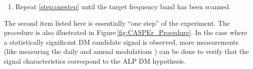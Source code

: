 \documentclass{WileyMSP-template}
\newcommand{\YZ}[1]{\textcolor{purple}{Yuzhe: #1}}
\newcommand{\HB}[1]{\textcolor{orange}{Hendrik: #1}}
\newcommand{\DK}[1]{\textcolor{brown}{Derek: #1}}
\begin{document}
\begin{enumerate}[label = (\arabic*)]
\begin{itemize}[label={}]
			\item G. If a DM candidate is found, further analysis on the candidate is performed and the measurement at this frequency is repeated. 
			\item H. If no DM candidates is found, certain ALP couplings strength can be excluded for the given mass. 
		\end{itemize}
		Note that after taking data, the value of the field can be incremented for the next step of the scan;
		\label{step:onestep} 
		\item Repeat \ref{step:onestep} until the target frequency band has been scanned. 
	\end{enumerate}
	The second item listed here is essentially ``one step'' of the experiment. The procedure is also illustrated in Figure\,\ref{fig:CASPEr_Procedure}. In the case where a statistically significant DM candidate signal is observed, more measurements (like measuring the daily and annual modulations \cite{Gramolin2022_SpectralPhysRevD}) can be done to verify that the signal characteristics correspond to the ALP DM hypothesis. 
\end{document}
